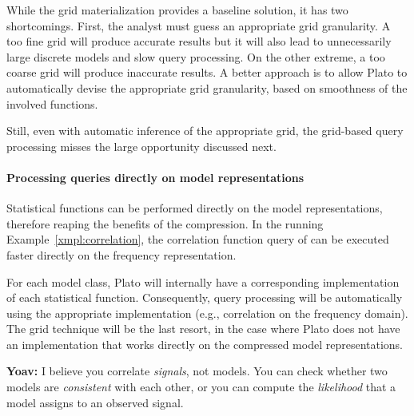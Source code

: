 While the grid materialization provides a baseline solution, it has two shortcomings. First, the analyst must guess an appropriate grid granularity. A too fine grid will produce accurate results but it will also lead to unnecessarily large discrete models and slow query processing. On the other extreme, a too coarse grid will produce inaccurate results. A better approach is to allow Plato to automatically devise the appropriate grid granularity, based on smoothness of the involved functions.

Still, even with automatic inference of the appropriate grid, the grid-based query processing misses the large opportunity discussed next.


\paragraph{Processing queries directly on model representations}
Statistical functions can be performed directly on the model representations, therefore reaping the benefits of the compression. In the running Example~\ref{xmpl:correlation}, the correlation function query of  can be executed faster directly on the frequency representation.%

For each model class, Plato will internally have a corresponding implementation of each statistical function. Consequently, query processing will be automatically using the appropriate implementation (e.g., correlation on the frequency domain). The grid technique will be the last resort, in the case where Plato does not have an implementation that works directly on the compressed model representations.

{\bf Yoav:} I believe you correlate {\em signals}, not models. You can
check whether two models are {\em consistent} with each other, or you
can compute the {\em likelihood} that a model assigns to an observed
signal.

